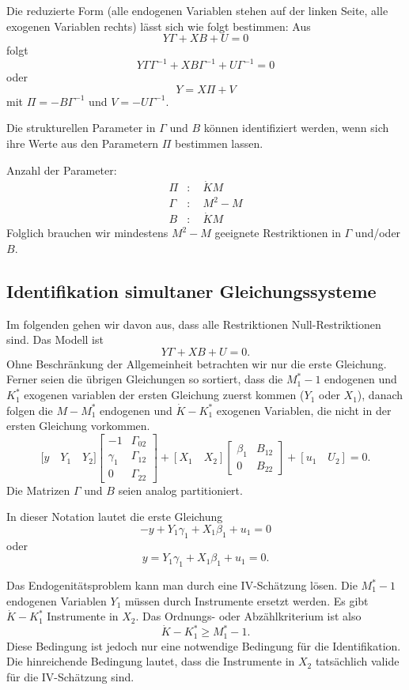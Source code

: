 \documentclass{article}
\begin{document}
Die reduzierte Form (alle endogenen Variablen stehen auf der linken
Seite, alle exogenen Variablen rechts) lässt sich wie folgt bestimmen:
Aus
\[ Y\Gamma+XB+U=0 \]
folgt
\[ Y\Gamma \Gamma^{-1}+XB\Gamma^{-1}+U\Gamma^{-1}=0 \]
oder
\[ Y=X\Pi+V \]
mit $\Pi=-B\Gamma^{-1}$ und $V=-U\Gamma^{-1}$.

Die strukturellen Parameter in $\Gamma $ und $B$ können
identifiziert werden, wenn sich ihre Werte aus den Parametern
$\Pi$ bestimmen lassen.

Anzahl der Parameter:
\begin{align*}
\Pi  &:\quad \dot{K}M \\
\Gamma  &:\quad M^{2}-M \\
B &:\quad \dot{K}M
\end{align*}
Folglich brauchen wir mindestens $M^2-M$ geeignete Restriktionen in $\Gamma$ 
und/oder $B$.

\subsection*{Identifikation simultaner Gleichungssysteme}

Im folgenden gehen wir davon aus, dass alle Restriktionen Null-Restriktionen sind.
Das Modell ist
\[ Y\Gamma +XB+U=0. \]
Ohne Beschränkung der Allgemeinheit betrachten wir nur die erste Gleichung.
Ferner seien die übrigen Gleichungen so sortiert, dass die $M_{1}^{\ast }-1$ 
endogenen und $K_{1}^{\ast }$ exogenen variablen der ersten Gleichung 
zuerst kommen ($Y_{1}$ oder $X_{1}$), danach folgen die $M-M_{1}^{\ast }$ 
endogenen und $\dot{K}-K_{1}^{\ast }$ exogenen Variablen, die nicht in der
ersten Gleichung vorkommen.
\[
\lbrack y\quad Y_{1}\quad Y_{2}]\left[ 
\begin{array}{cc}
-1 & \Gamma _{02} \\ 
\gamma _{1} & \Gamma _{12} \\ 
0 & \Gamma _{22}%
\end{array}%
\right] +[X_{1}\quad X_{2}]\left[ 
\begin{array}{cc}
\beta _{1} & B_{12} \\ 
0 & B_{22}%
\end{array}%
\right] +[u_{1}\quad U_{2}]=0. 
\]
Die Matrizen $\Gamma $ und $B$ seien analog partitioniert.

In dieser Notation lautet die erste Gleichung
\[ -y+Y_{1}\gamma _{1}+X_{1}\beta _{1}+u_{1}=0 \]
oder
\[ y=Y_{1}\gamma _{1}+X_{1}\beta _{1}+u_{1}=0. \]

Das Endogenitätsproblem kann man durch eine IV-Schätzung 
lösen. Die $M_{1}^{\ast }-1$ endogenen Variablen $Y_{1}$
müssen durch Instrumente ersetzt werden. Es gibt $\dot{K}-K_{1}^{\ast }$ 
Instrumente in $X_{2}$. Das Ordnungs- oder Abzählkriterium ist also
\[ \dot{K}-K_{1}^{\ast }\geq M_{1}^{\ast }-1. \]
Diese Bedingung ist jedoch nur eine notwendige Bedingung für
die Identifikation. Die hinreichende Bedingung lautet, dass
die Instrumente in $X_{2}$ tatsächlich valide für die IV-Schätzung sind.
\end{document}
